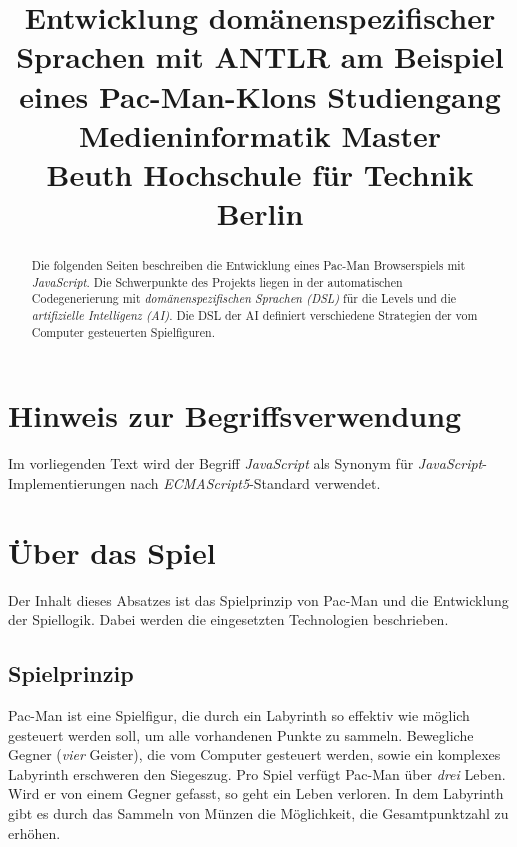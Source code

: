 \documentclass[conference]{IEEEtran}
\begin{document}
\title{%
  Entwicklung domänenspezifischer Sprachen mit ANTLR am Beispiel eines Pac-Man-Klons\bigbreak
  \large Studiengang Medieninformatik Master\\Beuth Hochschule für Technik Berlin}


\author{
\and
{}
\and
{}
}

\maketitle

\lstset{%
  basicstyle=\footnotesize\ttfamily
  }
\begin{abstract}
Die folgenden Seiten beschreiben die Entwicklung eines Pac-Man Browserspiels mit \emph{JavaScript}. Die Schwerpunkte des Projekts liegen in der automatischen Codegenerierung mit \emph{domänenspezifischen Sprachen (DSL)} für die Levels und die \emph{artifizielle Intelligenz (AI)}. Die DSL der AI definiert verschiedene Strategien der vom  Computer gesteuerten Spielfiguren.
\end{abstract}

\IEEEpeerreviewmaketitle

\section{Hinweis zur Begriffsverwendung}
Im vorliegenden Text wird der Begriff \emph{JavaScript} als Synonym für \emph{JavaScript}-Implementierungen nach \emph{ECMAScript5}-Standard verwendet.

\section{Über das Spiel}

Der Inhalt dieses Absatzes ist das Spielprinzip von Pac-Man und die Entwicklung der Spiellogik. Dabei werden die eingesetzten Technologien beschrieben.

\subsection{Spielprinzip}

Pac-Man ist eine Spielfigur, die durch ein Labyrinth so effektiv wie möglich gesteuert werden soll, um alle vorhandenen Punkte zu sammeln. Bewegliche Gegner (\emph{vier} Geister), die vom Computer gesteuert werden, sowie ein komplexes Labyrinth erschweren den Siegeszug. Pro Spiel verfügt Pac-Man über \emph{drei} Leben. Wird er von einem Gegner gefasst, so geht ein Leben verloren. In dem Labyrinth gibt es durch das Sammeln von Münzen die Möglichkeit, die Gesamtpunktzahl zu erhöhen.
\end{document}
